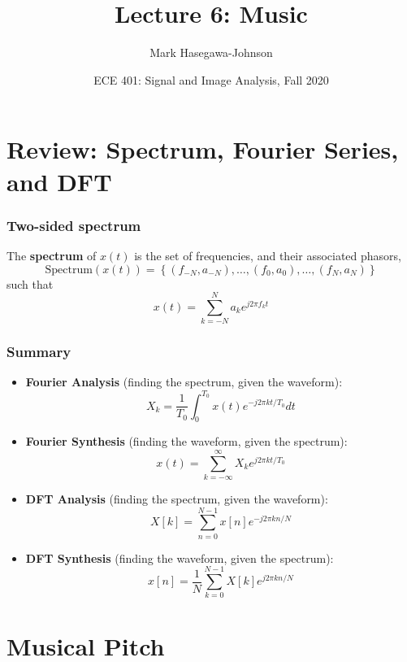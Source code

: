 \documentclass{beamer}
\title{Lecture 6: Music}
\author{Mark Hasegawa-Johnson}
\date{ECE 401: Signal and Image Analysis, Fall 2020}
\begin{document}
\begin{frame}
  \maketitle
\end{frame}

\begin{frame}
  \tableofcontents
\end{frame}

\section[Review]{Review: Spectrum, Fourier Series, and DFT}
\setcounter{subsection}{1}

\begin{frame}
  \frametitle{Two-sided spectrum}

  The {\bf spectrum} of $x(t)$ is the set of frequencies, and their
  associated phasors,
  \[
  \mbox{Spectrum}\left( x(t) \right) =
  \left\{ (f_{-N},a_{-N}), \ldots, (f_0,a_0), \ldots, (f_N,a_N) \right\}
  \]
  such that
  \[
  x(t) = \sum_{k=-N}^N a_ke^{j2\pi f_kt}
  \]
\end{frame}

\begin{frame}
  \frametitle{Summary}
  \begin{itemize}
  \item {\bf Fourier Analysis}  (finding the spectrum, given the waveform):
    \[
    X_k = \frac{1}{T_0}\int_0^{T_0} x(t)e^{-j2\pi kt/T_0}dt
    \]
  \item {\bf Fourier Synthesis}  (finding the waveform, given the spectrum):
    \[
    x(t) = \sum_{k=-\infty}^\infty X_k e^{j2\pi kt/T_0}
    \]
  \item {\bf DFT Analysis}  (finding the spectrum, given the waveform):
    \[
    X[k] = \sum_{n=0}^{N-1} x[n]e^{-j2\pi kn/N}
    \]
  \item {\bf DFT Synthesis} (finding the waveform, given the spectrum):
    \[
    x[n] = \frac{1}{N}\sum_{k=0}^{N-1} X[k] e^{j2\pi kn/N}
    \]
  \end{itemize}
\end{frame}  

\section[Pitch]{Musical Pitch}
\setcounter{subsection}{1}
\end{document}

